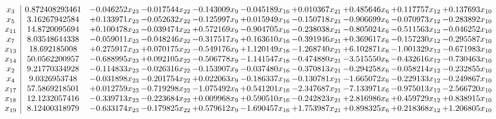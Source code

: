 \documentclass[10pt]{article}
\begin{document}
 \[\begin{array}{c| c c@{\hskip 2pt} c@{\hskip 2pt} c@{\hskip 2pt} c@{\hskip 2pt} c@{\hskip 2pt} c@{\hskip 2pt} c@{\hskip 2pt} c@{\hskip 2pt} }
 x_{3}   &  0.872408293461 & -0.046252 x_{23} & -0.017544 x_{22} & -0.143009 x_{9} & -0.045189 x_{16} & + 0.010367 x_{21} & + 0.485646 x_{6} & + 0.117757 x_{12} & + 0.137693 x_{10}\\
 x_{5}   &  3.16267942584 & + 0.133971 x_{23} & -0.052632 x_{22} & -0.125997 x_{9} & + 0.015949 x_{16} & -0.150718 x_{21} & -0.906699 x_{6} & -0.070973 x_{12} & -0.283892 x_{10}\\
 x_{11}   &  14.8720095694 & + 0.100478 x_{23} & -0.039474 x_{22} & + 0.572169 x_{9} & -0.904705 x_{16} & -0.238038 x_{21} & -0.805024 x_{6} & -0.511563 x_{12} & -0.046252 x_{10}\\
 x_{7}   &  8.03548644338 & -0.059011 x_{23} & -0.048246 x_{22} & -0.317517 x_{9} & + 0.163610 x_{16} & -0.391946 x_{21} & + 0.369617 x_{6} & -0.157230 x_{12} & -0.295587 x_{10}\\
 x_{13}   &  18.692185008 & + 0.275917 x_{23} & + 0.070175 x_{22} & -0.549176 x_{9} & + 1.120149 x_{16} & -1.268740 x_{21} & + 6.102871 x_{6} & -1.001329 x_{12} & -0.671983 x_{10}\\
 x_{14}   &  50.0562200957 & -0.688995 x_{23} & + 0.092105 x_{22} & -0.506778 x_{9} & -1.141547 x_{16} & -0.474880 x_{21} & -3.515550 x_{6} & -0.432616 x_{12} & -0.730463 x_{10}\\
 x_{2}   &  9.21770334928 & -0.114833 x_{23} & -0.026316 x_{22} & -0.153907 x_{9} & -0.037480 x_{16} & -0.370813 x_{21} & -0.294258 x_{6} & -0.058214 x_{12} & -0.232855 x_{10}\\
 x_{4}   &  9.0326953748 & -0.031898 x_{23} & -0.201754 x_{22} & + 0.022063 x_{9} & -0.186337 x_{16} & -0.130781 x_{21} & -1.665072 x_{6} & -0.229133 x_{12} & -0.249867 x_{10}\\
 x_{17}   &  57.5869218501 & + 0.012759 x_{23} & -0.719298 x_{22} & -1.075492 x_{9} & + 0.541201 x_{16} & -2.347687 x_{21} & -7.133971 x_{6} & -0.975013 x_{12} & -2.566720 x_{10}\\
 x_{18}   &  12.1232057416 & -0.339713 x_{23} & -0.223684 x_{22} & + 0.009968 x_{9} & + 0.590510 x_{16} & -0.242823 x_{21} & + 2.816986 x_{6} & + 0.459729 x_{12} & + 0.838915 x_{10}\\
 x_{19}   &  8.12400318979 & -0.633174 x_{23} & -0.179825 x_{22} & + 0.579612 x_{9} & -1.690457 x_{16} & + 1.753987 x_{21} & + 0.898325 x_{6} & + 0.218368 x_{12} & + 1.206805 x_{10}\\

\end{array}\]
\end{document}
